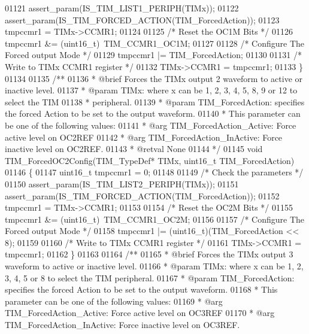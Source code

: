 \begin{DoxyCode}
01121   assert_param(IS\_TIM\_LIST1\_PERIPH(TIMx));
01122   assert_param(IS\_TIM\_FORCED\_ACTION(TIM\_ForcedAction));
01123   tmpccmr1 = TIMx->CCMR1;
01124 
01125   \textcolor{comment}{/* Reset the OC1M Bits */}
01126   tmpccmr1 &= (uint16\_t)~TIM_CCMR1_OC1M;
01127 
01128   \textcolor{comment}{/* Configure The Forced output Mode */}
01129   tmpccmr1 |= TIM\_ForcedAction;
01130 
01131   \textcolor{comment}{/* Write to TIMx CCMR1 register */}
01132   TIMx->CCMR1 = tmpccmr1;
01133 \}
01134 
01135 \textcolor{comment}{/**}
01136 \textcolor{comment}{  * @brief  Forces the TIMx output 2 waveform to active or inactive level.}
01137 \textcolor{comment}{  * @param  TIMx: where x can be  1, 2, 3, 4, 5, 8, 9 or 12 to select the TIM }
01138 \textcolor{comment}{  *         peripheral.}
01139 \textcolor{comment}{  * @param  TIM\_ForcedAction: specifies the forced Action to be set to the output waveform.}
01140 \textcolor{comment}{  *          This parameter can be one of the following values:}
01141 \textcolor{comment}{  *            @arg TIM\_ForcedAction\_Active: Force active level on OC2REF}
01142 \textcolor{comment}{  *            @arg TIM\_ForcedAction\_InActive: Force inactive level on OC2REF.}
01143 \textcolor{comment}{  * @retval None}
01144 \textcolor{comment}{  */}
01145 \textcolor{keywordtype}{void} TIM_ForcedOC2Config(TIM\_TypeDef* TIMx, uint16\_t TIM\_ForcedAction)
01146 \{
01147   uint16\_t tmpccmr1 = 0;
01148 
01149   \textcolor{comment}{/* Check the parameters */}
01150   assert_param(IS\_TIM\_LIST2\_PERIPH(TIMx));
01151   assert_param(IS\_TIM\_FORCED\_ACTION(TIM\_ForcedAction));
01152   tmpccmr1 = TIMx->CCMR1;
01153 
01154   \textcolor{comment}{/* Reset the OC2M Bits */}
01155   tmpccmr1 &= (uint16\_t)~TIM_CCMR1_OC2M;
01156 
01157   \textcolor{comment}{/* Configure The Forced output Mode */}
01158   tmpccmr1 |= (uint16\_t)(TIM\_ForcedAction << 8);
01159 
01160   \textcolor{comment}{/* Write to TIMx CCMR1 register */}
01161   TIMx->CCMR1 = tmpccmr1;
01162 \}
01163 
01164 \textcolor{comment}{/**}
01165 \textcolor{comment}{  * @brief  Forces the TIMx output 3 waveform to active or inactive level.}
01166 \textcolor{comment}{  * @param  TIMx: where x can be  1, 2, 3, 4, 5 or 8 to select the TIM peripheral.}
01167 \textcolor{comment}{  * @param  TIM\_ForcedAction: specifies the forced Action to be set to the output waveform.}
01168 \textcolor{comment}{  *          This parameter can be one of the following values:}
01169 \textcolor{comment}{  *            @arg TIM\_ForcedAction\_Active: Force active level on OC3REF}
01170 \textcolor{comment}{  *            @arg TIM\_ForcedAction\_InActive: Force inactive level on OC3REF.}

\end{DoxyCode}
